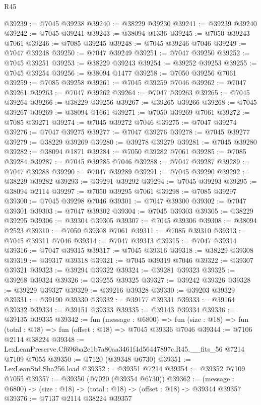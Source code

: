 \begin{lexlean}{R45}
\begin{coremodule}
{@39239 := @7045 @39238
@39240 := @38229 @39230
@39241 := @39239 @39240
@39242 := @7045 @39241
@39243 := @38094 @1336
@39245 := @7050 @39243 @7061
@39246 := @7085 @39245
@39248 := @7045 @39246 @7046
@39249 := @7047 @39248
@39250 := @7047 @39249
@39251 := @7047 @39250
@39252 := @7045 @39251
@39253 := @38229 @39243
@39254 := @39252 @39253
@39255 := @7045 @39254
@39256 := @38094 @1477
@39258 := @7050 @39256 @7061
@39259 := @7085 @39258
@39261 := @7045 @39259 @7046
@39262 := @7047 @39261
@39263 := @7047 @39262
@39264 := @7047 @39263
@39265 := @7045 @39264
@39266 := @38229 @39256
@39267 := @39265 @39266
@39268 := @7045 @39267
@39269 := @38094 @1661
@39271 := @7050 @39269 @7061
@39272 := @7085 @39271
@39274 := @7045 @39272 @7046
@39275 := @7047 @39274
@39276 := @7047 @39275
@39277 := @7047 @39276
@39278 := @7045 @39277
@39279 := @38229 @39269
@39280 := @39278 @39279
@39281 := @7045 @39280
@39282 := @38094 @1871
@39284 := @7050 @39282 @7061
@39285 := @7085 @39284
@39287 := @7045 @39285 @7046
@39288 := @7047 @39287
@39289 := @7047 @39288
@39290 := @7047 @39289
@39291 := @7045 @39290
@39292 := @38229 @39282
@39293 := @39291 @39292
@39294 := @7045 @39293
@39295 := @38094 @2114
@39297 := @7050 @39295 @7061
@39298 := @7085 @39297
@39300 := @7045 @39298 @7046
@39301 := @7047 @39300
@39302 := @7047 @39301
@39303 := @7047 @39302
@39304 := @7045 @39303
@39305 := @38229 @39295
@39306 := @39304 @39305
@39307 := @7045 @39306
@39308 := @38094 @2523
@39310 := @7050 @39308 @7061
@39311 := @7085 @39310
@39313 := @7045 @39311 @7046
@39314 := @7047 @39313
@39315 := @7047 @39314
@39316 := @7047 @39315
@39317 := @7045 @39316
@39318 := @38229 @39308
@39319 := @39317 @39318
@39321 := @7045 @39319 @7046
@39322 := @39307 @39321
@39323 := @39294 @39322
@39324 := @39281 @39323
@39325 := @39268 @39324
@39326 := @39255 @39325
@39327 := @39242 @39326
@39328 := @39229 @39327
@39329 := @39216 @39328
@39330 := @39203 @39329
@39331 := @39190 @39330
@39332 := @39177 @39331
@39333 := @39164 @39332
@39334 := @39151 @39333
@39335 := @39143 @39334
@39336 := @39135 @39335
@39342 := fun (message : @6800) =>
  fun (size : @18) => fun (total : @18) => fun (offset : @18) => @7045 @39336 @7046
@39344 := @7106 @2114 @38224
@39348 := LexLeanPreserve.Cf696ba2c1b7a80aa3461f4d56447897c.R45.__fits_56 @7214 @7109 @7055
@39350 := @7120 (@39348 @6730)
@39351 := LexLeanStd.Sha256.load
@39352 := @39351 @7214
@39354 := @39352 @7109 @7055
@39357 := @39350 (@7020 (@39354 @6730))
@39362 := (message : @6800) -> (size : @18) -> (total : @18) -> (offset : @18) -> @39344 @39357
@39376 := @7137
    @2114
    @38224
    @39357
}
\end{coremodule}
\end{lexlean}
